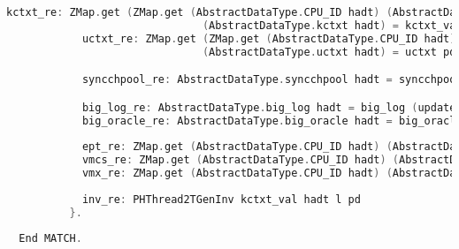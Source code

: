 \begin{lstlisting}[language=C]
            kctxt_re: ZMap.get (ZMap.get (AbstractDataType.CPU_ID hadt) (AbstractDataType.cid hadt)) 
                               (AbstractDataType.kctxt hadt) = kctxt_val;
            uctxt_re: ZMap.get (ZMap.get (AbstractDataType.CPU_ID hadt) (AbstractDataType.cid hadt))
                               (AbstractDataType.uctxt hadt) = uctxt pd;

            syncchpool_re: AbstractDataType.syncchpool hadt = syncchpool pd;

            big_log_re: AbstractDataType.big_log hadt = big_log (update init_shared_adt l);
            big_oracle_re: AbstractDataType.big_oracle hadt = big_oracle (update init_shared_adt l);
            
            ept_re: ZMap.get (AbstractDataType.CPU_ID hadt) (AbstractDataType.ept hadt) = ept pd;
            vmcs_re: ZMap.get (AbstractDataType.CPU_ID hadt) (AbstractDataType.vmcs hadt) = vmcs pd;
            vmx_re: ZMap.get (AbstractDataType.CPU_ID hadt) (AbstractDataType.vmx hadt) = vmx pd;
            
            inv_re: PHThread2TGenInv kctxt_val hadt l pd
          }.
                                                       
  End MATCH.

\end{lstlisting}
